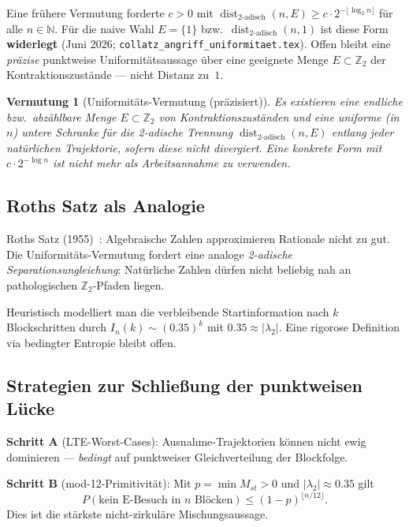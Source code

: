 \documentclass[12pt,a4paper]{article}
\newtheorem{vermutung}[satz]{Vermutung}
\newcommand{\N}{\mathbb{N}}
\newcommand{\Ztwo}{\mathbb{Z}_2}
\newcommand{\disttwo}{\operatorname{dist}_{2\text{-adisch}}}
\begin{document}
\begin{tcolorbox}[heuristik,title={Uniformität (historische Form; heuristisch / widerlegt für $\disttwo(\cdot,1)$)}]
Eine frühere Vermutung forderte $c>0$ mit
$\disttwo(n,E)\geq c\cdot 2^{-\lfloor\log_2 n\rfloor}$ für alle $n\in\N$.
Für die naive Wahl $E=\{1\}$ bzw.\ $\disttwo(n,1)$ ist diese Form
\textbf{widerlegt} (Juni 2026; \texttt{collatz\_angriff\_uniformitaet.tex}).
Offen bleibt eine \emph{präzise} punktweise Uniformitätsaussage über eine
geeignete Menge $E\subset\Ztwo$ der Kontraktionszustände --- nicht Distanz zu~$1$.
\end{tcolorbox}
\begin{vermutung}[Uniformitäts-Vermutung (präzisiert)]
\label{verm:uniform}
Es existieren eine endliche bzw.\ abzählbare Menge $E\subset\Ztwo$ von
Kontraktionszuständen und eine uniforme (in $n$) untere Schranke für die
2-adische Trennung $\disttwo(n,E)$ entlang jeder natürlichen Trajektorie,
sofern diese nicht divergiert. Eine konkrete Form mit $c\cdot 2^{-\log n}$
ist nicht mehr als Arbeitsannahme zu verwenden.
\end{vermutung}

\subsection{Roths Satz als Analogie}

Roths Satz (1955)~\cite{Roth1955}: Algebraische Zahlen approximieren Rationale
nicht zu gut. Die Uniformitäts-Vermutung fordert eine analoge
\emph{2-adische Separationsungleichung}: Natürliche Zahlen dürfen nicht
beliebig nah an pathologischen $\Ztwo$-Pfaden liegen.

Heuristisch modelliert man die verbleibende Startinformation nach
$k$ Blockschritten durch $I_n(k) \sim (0.35)^k$ mit
$0.35 \approx |\lambda_2|$. Eine rigorose Definition via bedingter
Entropie bleibt offen.

\subsection{Strategien zur Schließung der punktweisen Lücke}

\textbf{Schritt A} (LTE-Worst-Cases): Ausnahme-Trajektorien können nicht
ewig dominieren --- \emph{bedingt} auf punktweiser Gleichverteilung der
Blockfolge.

\textbf{Schritt B} (mod-12-Primitivität): Mit $p=\min M_{st}>0$ und
$|\lambda_2|\approx 0.35$ gilt
\[
  P(\text{kein E-Besuch in }n\text{ Blöcken})\leq (1-p)^{\lfloor n/12\rfloor}.
\]
Dies ist die stärkste nicht-zirkuläre Mischungsaussage.
\end{document}

